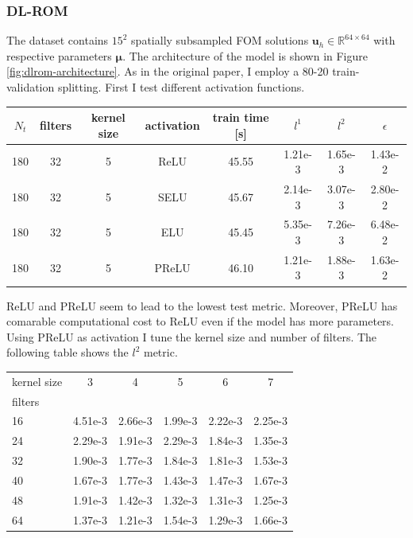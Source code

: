 \documentclass[11pt]{article}
\begin{document}
\subsubsection{DL-ROM}\label{sec:dlrom-lapl}
The dataset contains $15^2$ spatially subsampled FOM solutions $\mathbf u_h \in \mathbb R^{64 \times 64}$ with respective parameters $\boldsymbol \mu$. The architecture of the model is shown in Figure \ref{fig:dlrom-architecture}. As in the original paper, I employ a 80-20 train-validation splitting. First I test different activation functions.

\begin{center}
\begin{tabular}{ c|c|c|c|c|c|c|c } 
 $N_t$ & filters & kernel size & activation & train time [s] & $l^1$ & $l^2$ & $\epsilon$ \\ 
 \hline
 180 & 32 & 5 & ReLU & 45.55 &  1.21e-3 & 1.65e-3   & 1.43e-2\\
 180 & 32 & 5 & SELU &  45.67 &  2.14e-3 & 3.07e-3  & 2.80e-2\\
 180 & 32 & 5 & ELU &  45.45 &  5.35e-3 & 7.26e-3   & 6.48e-2\\
 180 & 32 & 5 & PReLU &  46.10 &  1.21e-3 & 1.88e-3 & 1.63e-2\\
\end{tabular}
\end{center}
ReLU and PReLU seem to lead to the lowest test metric. Moreover, PReLU has comarable computational cost to ReLU even if the model has more parameters. Using PReLU as activation  I tune the kernel size and number of filters. The following table shows the $l^2$ metric.

\begin{center}
\begin{tabular}{ l||c| c |c |c |c } 
   kernel size  & 3 & 4 & 5 & 6 & 7 \\ 
   filters &  &  &  &  &  \\ 
 \hline
 \hline
 16 & 4.51e-3 & 2.66e-3 & 1.99e-3 & 2.22e-3 & 2.25e-3 \\
 \hline
 24 & 2.29e-3 & 1.91e-3 & 2.29e-3 & 1.84e-3 & 1.35e-3  \\
 \hline
 32 & 1.90e-3 & 1.77e-3 & 1.84e-3 & 1.81e-3 & 1.53e-3  \\
 \hline
 40 & 1.67e-3 & 1.77e-3 & 1.43e-3 & 1.47e-3 & 1.67e-3  \\
 \hline
 48 & 1.91e-3 & 1.42e-3 & 1.32e-3 & 1.31e-3 & 1.25e-3  \\
 \hline
 64 & 1.37e-3 & 1.21e-3 & 1.54e-3 & 1.29e-3 & 1.66e-3 \\
\end{tabular}
\end{center}
\end{document}
